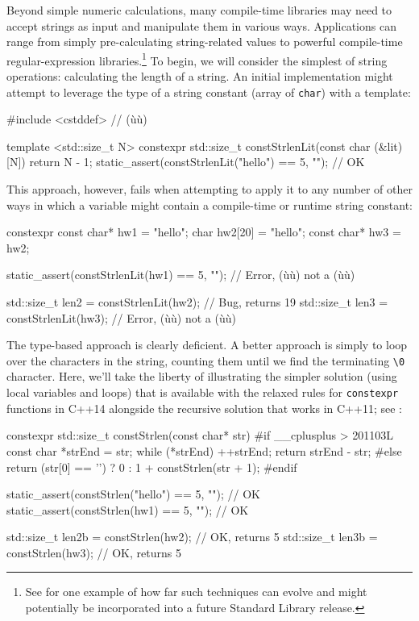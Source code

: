 Beyond simple numeric calculations, many compile-time libraries may need
to accept strings as input and manipulate them in various ways.
Applications can range from simply pre-calculating string-related values
to powerful compile-time regular-expression
libraries.{\cprotect\footnote{See \cite{dusikova19} for one example of how far such
techniques can evolve and might potentially be incorporated into a
  future Standard Library release.}} To begin, we will consider the
simplest of string operations: calculating the length of a string. An
initial implementation might attempt to leverage the type of a string
constant (array of \lstinline!char!) with a template:

\begin{emcppslisting}[emcppsbatch={e12,e13}]
#include <cstddef>  // (ù{}ù)

template <std::size_t N>
constexpr std::size_t constStrlenLit(const char (&lit)[N])
{
    return N - 1;
}
static_assert(constStrlenLit("hello") == 5, "");  // OK
\end{emcppslisting}
    

\noindent This approach, however, fails when attempting to apply it to any number
of other ways in which a variable might contain a compile-time or
runtime string constant:

\begin{emcppslisting}[emcppsbatch=e12]
constexpr const char* hw1     = "hello";
char                  hw2[20] = "hello";
const char*           hw3     = hw2;

static_assert(constStrlenLit(hw1) == 5, "");  // Error, (ù{}ù) not a (ù{}ù)

std::size_t len2 = constStrlenLit(hw2);  // Bug, returns 19
std::size_t len3 = constStrlenLit(hw3);  // Error, (ù{}ù) not a (ù{}ù)
\end{emcppslisting}
    

\noindent The type-based approach is clearly deficient. A better approach is
simply to loop over the characters in the string, counting them until we
find the terminating \lstinline!\0! character. Here, we'll take
the liberty of illustrating the simpler solution (using local variables
and loops) that is available with the relaxed rules for
\lstinline!constexpr! functions in C++14 alongside the recursive solution
that works in C++11; see :

\begin{emcppslisting}[emcppsbatch=e12]
constexpr std::size_t constStrlen(const char* str)
{
#if __cplusplus > 201103L
    const char *strEnd = str;
    while (*strEnd) ++strEnd;
    return strEnd - str;
#else
    return (str[0] == '\0') ? 0 : 1 + constStrlen(str + 1);
#endif
}

static_assert(constStrlen("hello") == 5, "");  // OK
static_assert(constStrlen(hw1)     == 5, "");  // OK

std::size_t len2b = constStrlen(hw2);  // OK, returns 5
std::size_t len3b = constStrlen(hw3);  // OK, returns 5
\end{emcppslisting}
    

